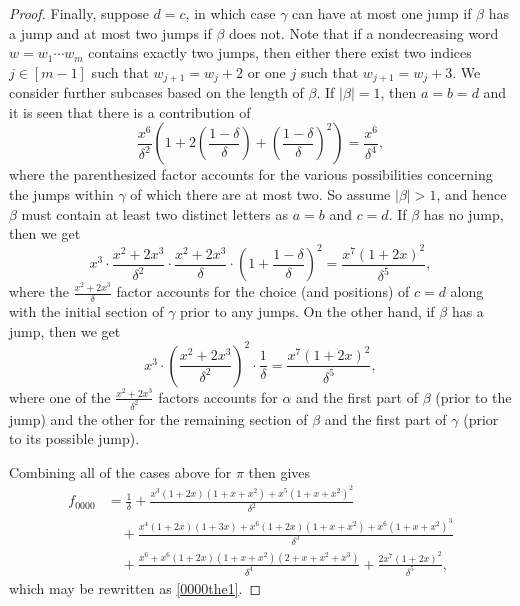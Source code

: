 \documentclass{article}
\theoremstyle{remark}
\theoremstyle{plain}
\begin{document}
\begin{proof}
Finally, suppose $d=c$, in which case $\gamma$ can have at most one jump if $\beta$ has a jump and at most two jumps if $\beta$ does not.  Note that if a nondecreasing word $w=w_1\cdots w_m$ contains exactly two jumps, then either there exist two indices $j \in [m-1]$ such that $w_{j+1}=w_j+2$ or one $j$  such that $w_{j+1}=w_j+3$.  We consider further subcases based on the length of $\beta$.  If $|\beta|=1$, then $a=b=d$ and it is seen that there is a contribution of
$$\frac{x^6}{\delta^2}\left(1+2\left(\frac{1-\delta}{\delta}\right)+\left(\frac{1-\delta}{\delta}\right)^2\right)=\frac{x^6}{\delta^4},$$
where the parenthesized factor accounts for the various possibilities concerning the jumps within $\gamma$ of which there are at most two.  So assume $|\beta|>1$, and hence $\beta$ must contain at least two distinct letters as $a=b$ and $c=d$. If $\beta$ has no jump, then we get
$$x^3\cdot\frac{x^2+2x^3}{\delta^2}\cdot\frac{x^2+2x^3}{\delta}\cdot\left(1+\frac{1-\delta}{\delta}\right)^2=\frac{x^7(1+2x)^2}{\delta^5},$$
where the $\frac{x^2+2x^3}{\delta}$ factor accounts for the choice (and positions) of $c=d$ along with the initial section of $\gamma$ prior to any jumps.  On the other hand, if $\beta$ has a jump, then we get
$$x^3\cdot\left(\frac{x^2+2x^3}{\delta^2}\right)^2\cdot\frac{1}{\delta}=\frac{x^7(1+2x)^2}{\delta^5},$$
where one of the $\frac{x^2+2x^3}{\delta^2}$ factors accounts for $\alpha$ and the first part of $\beta$ (prior to the jump) and the other for the remaining section of $\beta$ and the first part of $\gamma$ (prior to its possible jump).

Combining all of the cases above for $\pi$ then gives
\begin{align*}
f_{0000}&=\frac{1}{\delta}+\frac{x^3(1+2x)(1+x+x^2)+x^5(1+x+x^2)^2}{\delta^2}\\
&\quad+\frac{x^4(1+2x)(1+3x)+x^6(1+2x)(1+x+x^2)+x^6(1+x+x^2)^3}{\delta^3}\\
&\quad+\frac{x^6+x^6(1+2x)(1+x+x^2)(2+x+x^2+x^3)}{\delta^4}+\frac{2x^7(1+2x)^2}{\delta^5},
\end{align*}
which may be rewritten as \eqref{0000the1}.
\end{proof}
\end{document}
